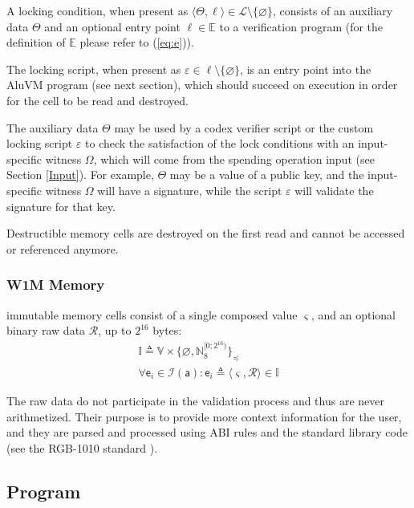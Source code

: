 \documentclass[9pt,oneside]{amsart}
\begin{document}
\begin{multicols}{2}
A locking condition, when present as $\langle \Theta, \ell \rangle \in \mathcal{L} \setminus \{ \varnothing \}$,
consists of an auxiliary data $\Theta$ and an optional entry point $\ell \in \mathbb{E}$ to a verification program
(for the definition of $\mathbb{E}$ please refer to (\ref{eq:e})).

The locking script, when present as $\varepsilon \in \ell \setminus \{ \varnothing \}$,
is an entry point into the AluVM program (see next section),
which should succeed on execution in order for the cell to be read and destroyed.

The auxiliary data $\Theta$ may be used by a codex verifier script or the custom locking script $\varepsilon$
to check the satisfaction of the lock conditions with an input-specific witness $\Omega$,
which will come from the spending operation input (see Section \ref{Input}).
For example, $\Theta$ may be a value of a public key,
and the input-specific witness $\Omega$ will have a signature,
while the script $\varepsilon$ will validate the signature for that key.

Destructible memory cells are destroyed on the first read and cannot be accessed or referenced anymore.

\subsubsection{W1M Memory}\label{W1M}

\Gls{immutable memory} cells consist of a single \gls{composed value} $\varsigma$,
and an optional binary raw data $\mathcal{R}$, up to $2^{16}$ bytes:
\noindent
\begin{gather}
\mathbb{I} \triangleq \mathbb{V} \times \{ \varnothing, \mathbb{N}_8^{[0; 2^{16})} \}_\preceq \\
\forall \mathsf{e}_i \in \mathcal{I}(\mathsf{a}) : \mathsf{e}_i \triangleq \langle \varsigma, \mathcal{R} \rangle \in \mathbb{I}
\end{gather}

The raw data do not participate in the validation process and thus are never arithmetized.
Their purpose is to provide more context information for the user, and they are parsed and processed
using ABI rules and the standard library code (see the RGB-1010 standard \cite{RGB1010}).


\subsection{Program}\label{Program}


\end{multicols}
\end{document}
